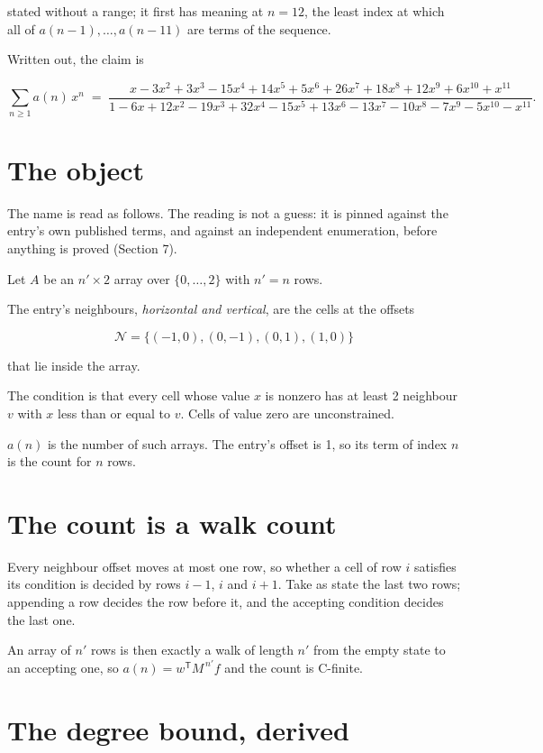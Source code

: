 \documentclass[11pt]{article}
\theoremstyle{definition}
\begin{document}
stated without a range; it first has meaning at $n = 12$, the least index at which all of $a(n-1),\dots,a(n-11)$ are terms of the sequence.

Written out, the claim is

\[\sum_{n \ge 1} a(n)\,x^n \;=\; \frac{x - 3x^{2} + 3x^{3} - 15x^{4} + 14x^{5} + 5x^{6} + 26x^{7} + 18x^{8} + 12x^{9} + 6x^{10} + x^{11}}{1 - 6x + 12x^{2} - 19x^{3} + 32x^{4} - 15x^{5} + 13x^{6} - 13x^{7} - 10x^{8} - 7x^{9} - 5x^{10} - x^{11}}.\]

\section{The object}

The name is read as follows. The reading is not a guess: it is pinned against the entry's own published terms, and against an independent enumeration, before anything is proved (Section 7).

Let $A$ be an $n' \times 2$ array over $\{0,\dots,2\}$ with $n' = n$ rows.

The entry's neighbours, {\itshape horizontal and vertical}, are the cells at the offsets

\[\mathcal{N} = \{(-1,0), (0,-1), (0,1), (1,0)\}\]

that lie inside the array.

The condition is that every cell whose value $x$ is nonzero has at least 2 neighbour $v$ with $x$ less than or equal to $v$. Cells of value zero are unconstrained.

$a(n)$ is the number of such arrays. The entry's offset is 1, so its term of index $n$ is the count for $n$ rows.

\section{The count is a walk count}

Every neighbour offset moves at most one row, so whether a cell of row $i$ satisfies its condition is decided by rows $i-1$, $i$ and $i+1$. Take as state the last two rows; appending a row decides the row before it, and the accepting condition decides the last one.

An array of $n'$ rows is then exactly a walk of length $n'$ from the empty state to an accepting one, so $a(n) = w^{\mathsf T}M^{\,n'}f$ and the count is C-finite.

\section{The degree bound, derived}
\end{document}
